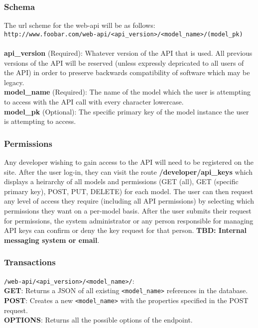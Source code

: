 \documentclass{article}
\begin{document}
\subsubsection{Schema}
The url scheme for the web-api will be as follows: 
\\ \texttt{http://www.foobar.com/web-api/<api\_version>/<model\_name>/(model\_pk)}
\\ 
\\
\textbf{api\_version} (Required): Whatever version of the API that is used. All
previous versions of the API will be reserved (unless expressly depricated to
all users of the API) in order to preserve backwards compatibility of software
which may be legacy. %
\\
\textbf{model\_name} (Required): The name of the model which the user is
attempting to access with the API call with every character lowercase. 
\\
\textbf{model\_pk} (Optional): The specific primary key of the model instance
the user is attempting to access. %

\subsubsection{Permissions}
Any developer wishing to gain access to the API will need to be registered on 
the site. After the user log-in, they can visit the route 
\textbf{/developer/api\_keys} which displays a heirarchy of all models and
permissions (GET (all), GET (specific primary key), POST, PUT, DELETE) for each
model. The user can then request any level of access they require (including
all API permissions) by selecting which permissions they want on a per-model
basis. After the user submits their request for permissions, the system
administrator or any person responsible for managing API keys can confirm or
deny the key request for that person. \textbf{TBD: Internal messaging system or
email}. %

\subsubsection{Transactions}
\texttt{/web-api/<api\_version>/<model\_name>/}:
\\
\textbf{GET}: Returns a JSON of all existing \texttt{<model\_name>} references in the
database.
\\
\textbf{POST}: Creates a new \texttt{<model\_name>} with the properties specified in the
POST request.
\\
\textbf{OPTIONS}: Returns all the possible options of the endpoint.
\end{document}
